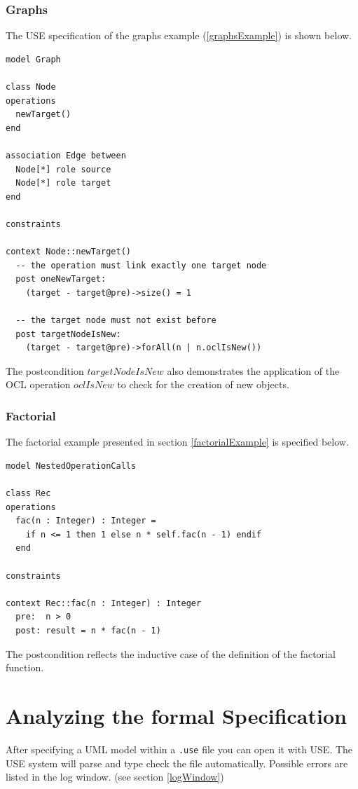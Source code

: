 \documentclass[a4paper,titlepage,oneside,final]{scrreprt} %
\begin{document}
\subsection{Graphs}\label{graphsSpec}
The USE specification of the graphs example (\ref{graphsExample}) is shown below.
\begin{verbatim}
model Graph

class Node
operations
  newTarget()
end

association Edge between
  Node[*] role source
  Node[*] role target
end

constraints

context Node::newTarget()
  -- the operation must link exactly one target node
  post oneNewTarget:
    (target - target@pre)->size() = 1

  -- the target node must not exist before
  post targetNodeIsNew:
    (target - target@pre)->forAll(n | n.oclIsNew())
\end{verbatim}
The postcondition $\mathit{targetNodeIsNew}$ also demonstrates the
application of the OCL operation $\mathit{oclIsNew}$ to check for
the creation of new objects.
\subsection{Factorial}\label{factorialSpec}
The factorial example presented in section \ref{factorialExample} is specified below.
\begin{verbatim}
model NestedOperationCalls

class Rec
operations
  fac(n : Integer) : Integer =
    if n <= 1 then 1 else n * self.fac(n - 1) endif
  end

constraints

context Rec::fac(n : Integer) : Integer
  pre:  n > 0
  post: result = n * fac(n - 1)
\end{verbatim}
The postcondition reflects the inductive case of the definition
of the factorial function.
\chapter{Analyzing the formal Specification}
After specifying a UML model within a \verb+.use+ file
you can open it with USE. The USE system will parse and type check the file
automatically. Possible errors are listed in the log window. (see section \ref{logWindow})
\end{document}
